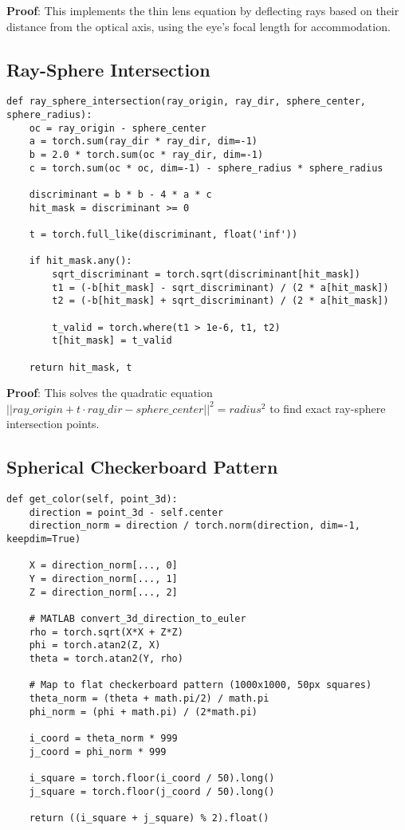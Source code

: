 \documentclass[11pt]{article}
\begin{document}
\textbf{Proof}: This implements the thin lens equation by deflecting rays based on their distance from the optical axis, using the eye's focal length for accommodation.

\subsection{Ray-Sphere Intersection}

\begin{lstlisting}[caption={Ray-sphere intersection calculation}]
def ray_sphere_intersection(ray_origin, ray_dir, sphere_center, sphere_radius):
    oc = ray_origin - sphere_center
    a = torch.sum(ray_dir * ray_dir, dim=-1)
    b = 2.0 * torch.sum(oc * ray_dir, dim=-1)
    c = torch.sum(oc * oc, dim=-1) - sphere_radius * sphere_radius
    
    discriminant = b * b - 4 * a * c
    hit_mask = discriminant >= 0
    
    t = torch.full_like(discriminant, float('inf'))
    
    if hit_mask.any():
        sqrt_discriminant = torch.sqrt(discriminant[hit_mask])
        t1 = (-b[hit_mask] - sqrt_discriminant) / (2 * a[hit_mask])
        t2 = (-b[hit_mask] + sqrt_discriminant) / (2 * a[hit_mask])
        
        t_valid = torch.where(t1 > 1e-6, t1, t2)
        t[hit_mask] = t_valid
    
    return hit_mask, t
\end{lstlisting}

\textbf{Proof}: This solves the quadratic equation $||ray\_origin + t \cdot ray\_dir - sphere\_center||^2 = radius^2$ to find exact ray-sphere intersection points.

\subsection{Spherical Checkerboard Pattern}

\begin{lstlisting}[caption={MATLAB-compatible checkerboard pattern}]
def get_color(self, point_3d):
    direction = point_3d - self.center
    direction_norm = direction / torch.norm(direction, dim=-1, keepdim=True)
    
    X = direction_norm[..., 0]
    Y = direction_norm[..., 1] 
    Z = direction_norm[..., 2]
    
    # MATLAB convert_3d_direction_to_euler
    rho = torch.sqrt(X*X + Z*Z)
    phi = torch.atan2(Z, X)
    theta = torch.atan2(Y, rho)
    
    # Map to flat checkerboard pattern (1000x1000, 50px squares)
    theta_norm = (theta + math.pi/2) / math.pi
    phi_norm = (phi + math.pi) / (2*math.pi)
    
    i_coord = theta_norm * 999
    j_coord = phi_norm * 999
    
    i_square = torch.floor(i_coord / 50).long()
    j_square = torch.floor(j_coord / 50).long()
    
    return ((i_square + j_square) % 2).float()
\end{lstlisting}
\end{document}
